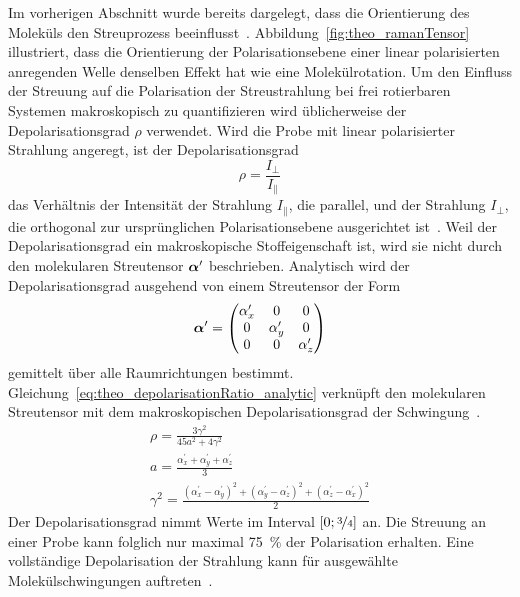 \documentclass[a4paper,12pt,twoside,parskip=no,headsepline,open=right,ngerman,export]{scrreprt}
\begin{document}
            Im vorherigen Abschnitt wurde bereits dargelegt, dass die Orientierung des Moleküls den Streuprozess beeinflusst~\cite{chalmers_raman_2006}. Abbildung~\ref{fig:theo_ramanTensor} illustriert, dass die Orientierung der Polarisationsebene einer linear polarisierten anregenden Welle denselben Effekt hat wie eine Molekülrotation. Um den Einfluss der Streuung auf die Polarisation der Streustrahlung bei frei rotierbaren Systemen makroskopisch zu quantifizieren wird üblicherweise der Depolarisationsgrad $\rho$ verwendet. Wird die Probe mit linear polarisierter Strahlung angeregt, ist der Depolarisationsgrad 
            \begin{equation}
                \rho = \frac{I_{\perp}}{I_{\parallel}} \label{eq:theo_depolarisationRatio_exp}
            \end{equation}
            das Verhältnis der Intensität der Strahlung $I_\parallel$, die parallel, und der Strahlung $I_\perp$, die orthogonal zur ursprünglichen Polarisationsebene ausgerichtet ist~\cite{zare_angular_1988}. Weil der Depolarisationsgrad ein makroskopische Stoffeigenschaft ist, wird sie nicht durch den molekularen Streutensor $\boldsymbol\alpha^\prime$ beschrieben. Analytisch wird der Depolarisationsgrad ausgehend von einem Streutensor der Form 
            \begin{equation*}
                \boldsymbol\alpha^\prime = \begin{pmatrix}   \alpha^\prime_x  & 0         & 0 \\
                                                0         & \alpha^\prime_y  & 0 \\
                                                0         & 0         & \alpha^\prime_z
                              \end{pmatrix}
            \end{equation*}
            gemittelt über alle Raumrichtungen bestimmt. Gleichung~\ref{eq:theo_depolarisationRatio_analytic} verknüpft den molekularen Streutensor mit dem makroskopischen Depolarisationsgrad der Schwingung~\cite{zare_angular_1988}.
            \begin{gather}
                \rho = \frac{3 \gamma^2}{45 a^2 + 4 \gamma^2} \label{eq:theo_depolarisationRatio_analytic}\\
                \nonumber
                a = \frac{\alpha^\prime_x + \alpha^\prime_y +\alpha^\prime_z }{3} \\
                \nonumber
                \gamma^2 = \frac{ (\alpha^\prime_x - \alpha^\prime_y)^2 + (\alpha^\prime_y - \alpha^\prime_z)^2 + (\alpha^\prime_z - \alpha^\prime_x)^2 }{2}
            \end{gather}
            Der Depolarisationsgrad nimmt Werte im Interval $[0;\nicefrac{3}{4}]$ an. Die Streuung an einer Probe kann folglich nur maximal \SI{75}{\percent} der Polarisation erhalten. Eine vollständige Depolarisation der Strahlung kann für ausgewählte Molekülschwingungen auftreten~\cite{chalmers_raman_2006}.
            
\end{document}
